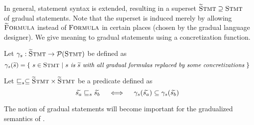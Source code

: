 In general, statement syntax is extended, resulting in a superset $\textup{\textsc{\ensuremath{\widetilde{\text{S}}}tmt}} \supseteq \textup{\textsc{Stmt}}$ of gradual statements.
Note that the superset is induced merely by allowing $\textup{\textsc{\ensuremath{\widetilde{\text{F}}}ormula}}$ instead of $\textup{\textsc{Formula}}$ in certain places (chosen by the gradual language designer).
We give meaning to gradual statements using a concretization function. %
\begin{definition}
    Let $\gamma_s : \textup{\textsc{\ensuremath{\widetilde{\text{S}}}tmt}} \rightarrow \mathcal{P}(\textup{\textsc{Stmt}})$ be defined as
    \begin{displaymath}
    \gamma_s(\widetilde{s}) = \{~ s \in \textup{\textsc{Stmt}} ~|~ \textit{$s$ is $\widetilde{s}$ with all gradual formulas replaced by some concretizations} ~\}
    \end{displaymath}
\end{definition}
\begin{definition}
    Let $\sqsubseteq_s \subseteq \textup{\textsc{\ensuremath{\widetilde{\text{S}}}tmt}} \times \textup{\textsc{\ensuremath{\widetilde{\text{S}}}tmt}}$ be a predicate defined as
    $$\widetilde{s_a} \sqsubseteq_s \widetilde{s_b}  \quad\iff\quad  \gamma_s(\widetilde{s_a}) \subseteq \gamma_s(\widetilde{s_b})$$
\end{definition}

The notion of gradual statements will become important for the gradualized semantics of \gvl.
